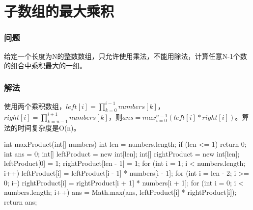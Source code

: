 \section{子数组的最大乘积} %
\label{sec:max-product}

\subsubsection{问题}
给定一个长度为N的整数数组，只允许使用乘法，不能用除法，计算任意N-1个数的组合中乘积最大的一组。

\subsubsection{解法}
使用两个乘积数组，$left[i]=\prod_{k=0}^{i-1}numbers[k]$，$right[i]=\prod_{k=n-1}^{i+1}numbers[k]$，则$ans = max_{i=0}^{n-1}(left[i]*right[i])$。算法的时间复杂度是O(n)。

\begin{Codex}[label={[$O(n)+O(n)$]Chap02_13_MaxProduct.java}]
int maxProduct(int[] numbers) {
    int len = numbers.length;
    if (len <= 1) {
        return 0;
    }
    int ans = 0;
    int[] leftProduct = new int[len];
    int[] rightProduct = new int[len];
    leftProduct[0] = 1;
    rightProduct[len - 1] = 1;
    for (int i = 1; i < numbers.length; i++) {
        leftProduct[i] = leftProduct[i - 1] * numbers[i - 1];
    }
    for (int i = len - 2; i >= 0; i--) {
        rightProduct[i] = rightProduct[i + 1] * numbers[i + 1];
    }
    for (int i = 0; i < numbers.length; i++) {
        ans = Math.max(ans, leftProduct[i] * rightProduct[i]);
    }
    return ans;
}
\end{Codex}

